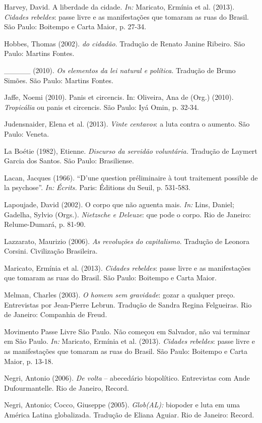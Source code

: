 Harvey, David. A liberdade da cidade. \emph{In: }Maricato, Ermínia et
al. (2013). \emph{Cidades rebeldes}: passe livre e as manifestações que
tomaram as ruas do Brasil. São Paulo: Boitempo e Carta Maior, p. 27-34.

Hobbes, Thomas (2002). \emph{do cidadão}. Tradução de Renato Janine
Ribeiro. São Paulo: Martins Fontes.

\_\_\_\_\_ (2010). \emph{Os elementos da lei natural e política}.
Tradução de Bruno Simões. São Paulo: Martins Fontes.

Jaffe, Noemi (2010). Panis et circencis. In: Oliveira, Ana de (Org.)
(2010). \emph{Tropicália }ou panis et circencis. São Paulo: Iyá Omin, p.
32-34.

Judensnaider, Elena et al. (2013). \emph{Vinte centavos}: a luta contra
o aumento. São Paulo: Veneta.

La Boétie (1982), Etienne. \emph{Discurso da servidão voluntária.
}Tradução de Laymert Garcia dos Santos. São Paulo: Brasiliense.

Lacan, Jacques (1966). ``D'une question préliminaire à tout traitement
possible de la psychose''. \emph{In:} \emph{Écrits. }Paris: Éditions du
Seuil, p. 531-583.

Lapoujade, David (2002). O corpo que não aguenta mais. \emph{In: }Lins,
Daniel; Gadelha, Sylvio (Orgs.).\emph{ Nietzsche e Deleuze}: que pode o
corpo. Rio de Janeiro: Relume-Dumará, p. 81-90.

Lazzarato, Maurizio (2006). \emph{As revoluções do capitalismo}.
Tradução de Leonora Corsini. Civilização Brasileira.

Maricato, Ermínia et al. (2013). \emph{Cidades rebeldes}: passe livre e
as manifestações que tomaram as ruas do Brasil. São Paulo: Boitempo e
Carta Maior.

Melman, Charles (2003). \emph{O homem sem gravidade}: gozar a qualquer
preço. Entrevistas por Jean-Pierre Lebrun. Tradução de Sandra Regina
Felgueiras. Rio de Janeiro: Companhia de Freud.

Movimento Passe Livre São Paulo. Não começou em Salvador, não vai
terminar em São Paulo. \emph{In: }Maricato, Ermínia et al. (2013).
\emph{Cidades rebeldes}: passe livre e as manifestações que tomaram as
ruas do Brasil. São Paulo: Boitempo e Carta Maior, p. 13-18.

Negri, Antonio (2006). \emph{De volta }-- abecedário biopolítico.
Entrevistas com Ande Dufourmantelle. Rio de Janeiro, Record.

Negri, Antonio; Cocco, Giuseppe (2005). \emph{Glob(AL): }biopoder e luta
em uma América Latina globalizada. Tradução de Eliana Aguiar. Rio de
Janeiro: Record.

